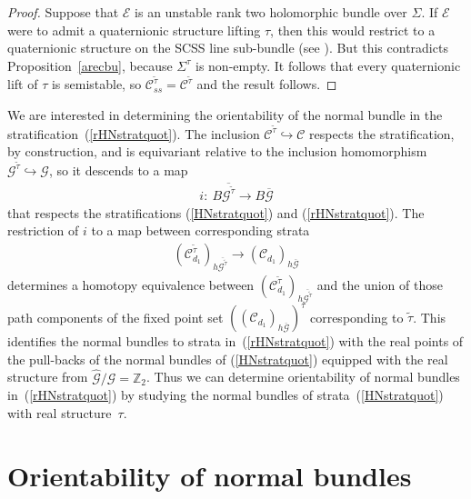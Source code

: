 \documentclass[10pt,a4paper]{amsart}
\numberwithin{equation}{section}
\begin{document}
\begin{proof}
Suppose that ${\mathcal E}$ is an unstable rank two holomorphic bundle over $\Sigma$. If ${\mathcal E}$ were to admit a quaternionic structure lifting $\tau$, then this would restrict to a quaternionic structure on the SCSS line sub-bundle (see \cite[Section~2.2]{B}). But this contradicts Proposition~\ref{arecbu}, because $\Sigma^{\tau}$ is non-empty. It follows that every quaternionic lift of $\tau$ is semistable, so ${\mathcal C}^{\tilde{\tau}}_{ss} = {\mathcal C}^{\tilde{\tau}}$ and the result follows.
\end{proof}

We are interested in determining the orientability of the normal bundle in the stratif\/ica\-tion~(\ref{rHNstratquot}). The inclusion ${\mathcal C}^{\tilde{\tau}} \hookrightarrow {\mathcal C}$ respects the stratif\/ication, by construction, and is equivariant relative to the inclusion homomorphism ${\mathcal G}^{\tilde{\tau}} \hookrightarrow {\mathcal G}$, so it descends to a map
\begin{gather*} i\colon \ B \overline{{\mathcal G}^{\tilde{\tau}}} \rightarrow B\overline{{\mathcal G}}\end{gather*}
that respects the stratif\/ications (\ref{HNstratquot}) and (\ref{rHNstratquot}). The restriction of $i$ to a map between corresponding strata \begin{gather*}({\mathcal C}_{d_1}^{\tilde{\tau}})_{h\overline{{\mathcal G}^{\tilde{\tau}}}} \rightarrow ({\mathcal C}_{d_1})_{h\overline{{\mathcal G}}}\end{gather*} determines a homotopy equivalence between $({\mathcal C}_{d_1}^{\tilde{\tau}})_{h\overline{{\mathcal G}^{\tilde{\tau}}}}$ and the union of those path components of the f\/ixed point set $(({\mathcal C}_{d_1})_{h\overline{{\mathcal G}}})^{\tau}$ corresponding to $\tilde{\tau}$. This identif\/ies the normal bundles to strata in~(\ref{rHNstratquot}) with the real points of the pull-backs of the normal bundles of (\ref{HNstratquot}) equipped with the real structure from $\hat{{\mathcal G}}/{\mathcal G} = {\mathbb Z}_2$. Thus we can determine orientability of normal bundles in~(\ref{rHNstratquot}) by studying the normal bundles of strata~(\ref{HNstratquot}) with real structure~$\tau$.

\section{Orientability of normal bundles}\label{ornormbund}
\end{document}
